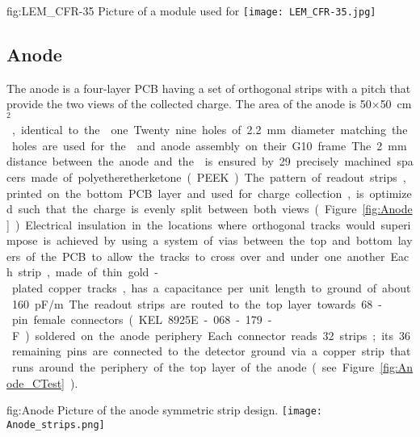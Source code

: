 \begin{dunefigure}
{fig:LEM_CFR-35}
{Picture of a  module used for  }
\texttt{[image: LEM\_CFR-35.jpg]}
\end{dunefigure}

\subsection{Anode}
\label{sec:fddp-crp-anode}
 
The anode is a four-layer PCB having a set of orthogonal strips with a \dpstrippitch pitch that provide the two views of the collected charge. The area of the anode is  \num{50}$\times$\SI{50}{cm$^2$}, identical to the  one. Twenty nine holes of \SI{2.2}{mm} diameter matching the  holes are used for the  and anode assembly on their G10 frame. The \SI{2}{mm} distance between the anode and the  is ensured by \num{29} precisely machined spacers made of polyetheretherketone (PEEK). 

The pattern of readout strips, printed on the bottom PCB layer and used for charge collection, is optimized such that the charge is evenly split between both views (Figure~\ref{fig:Anode}). Electrical insulation in the locations where orthogonal tracks would superimpose is achieved by 
using a system of vias between the top and bottom layers of the PCB to allow the tracks to cross over and under one another. 
Each strip, made of thin gold-plated copper tracks, has a capacitance per unit length to ground of about 
\SI{160}{pF/m}. The readout strips are routed to the top layer towards \num{68}-pin female connectors (KEL 8925E-068-179-F) soldered on the anode periphery. Each connector reads \num{32} strips; its \num{36} remaining pins are connected to the detector ground via a copper strip that runs around the periphery of the top layer of the anode (see Figure \ref{fig:Anode_CTest}). 

\begin{dunefigure}
{fig:Anode}
{Picture of the anode symmetric \twod strip design.}
  \texttt{[image: Anode\_strips.png]}
\end{dunefigure}

